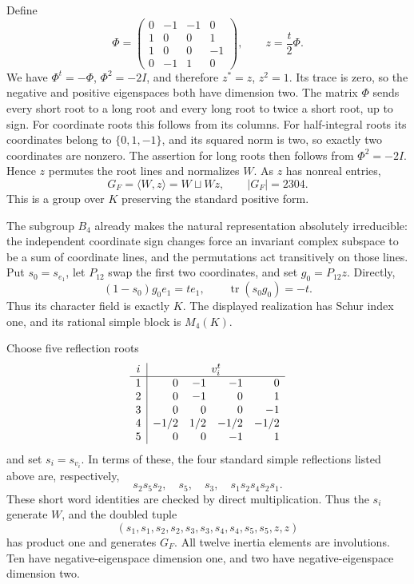 Define
\[
 \Phi=\begin{pmatrix}
 0&-1&-1&0\\1&0&0&1\\1&0&0&-1\\0&-1&1&0
 \end{pmatrix},\qquad z=\frac t2\Phi.
\]
We have \(\Phi^t=-\Phi\), \(\Phi^2=-2I\), and therefore
\(z^*=z\), \(z^2=1\).  Its trace is zero, so the negative and positive
eigenspaces both have dimension two.  The matrix \(\Phi\) sends every
short root to a long root and every long root to twice a short root,
up to sign.  For coordinate roots this follows from its columns.  For
half-integral roots its coordinates belong to \(\{0,1,-1\}\), and its
squared norm is two, so exactly two coordinates are nonzero.  The assertion
for long roots then follows from \(\Phi^2=-2I\).  Hence \(z\) permutes
the root lines and normalizes \(W\).  As \(z\) has nonreal entries,
\[
             G_F=\langle W,z\rangle=W\sqcup Wz,\qquad |G_F|=2304.
\]
This is a group over \(K\) preserving the standard positive form.

The subgroup \(B_4\) already makes the natural representation absolutely
irreducible: the independent coordinate sign changes force an invariant
complex subspace to be a sum of coordinate lines, and the permutations
act transitively on those lines.  Put \(s_0=s_{e_1}\), let \(P_{12}\)
swap the first two coordinates, and set \(g_0=P_{12}z\).  Directly,
\[
       (1-s_0)g_0e_1=te_1,
       \qquad \operatorname{tr}(s_0g_0)=-t.
\]
Thus its character field is exactly \(K\).  The displayed realization
has Schur index one, and its rational simple block is \(M_4(K)\).

Choose five reflection roots
\[
\begin{array}{c|rrrr}
 i&\multicolumn{4}{c}{v_i^t}\\\hline
1&0&-1&-1&0\\
2&0&-1&0&1\\
3&0&0&0&-1\\
4&-1/2&1/2&-1/2&-1/2\\
5&0&0&-1&1
\end{array}
\]
and set \(s_i=s_{v_i}\).  In terms of these, the four standard simple
reflections listed above are, respectively,
\[
                 s_2s_5s_2,\quad s_5,\quad s_3,\quad
                 s_1s_2s_4s_2s_1.
\]
These short word identities are checked by direct multiplication.  Thus
the \(s_i\) generate \(W\), and the doubled tuple
\[
       (s_1,s_1,s_2,s_2,s_3,s_3,s_4,s_4,s_5,s_5,z,z)
\]
has product one and generates \(G_F\).  All twelve inertia elements
are involutions.  Ten have negative-eigenspace dimension one, and two
have negative-eigenspace dimension two.

